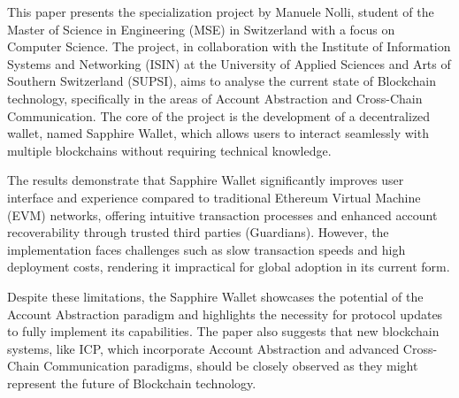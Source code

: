 \label{chap:abstract}

This paper presents the specialization project by Manuele Nolli, student of the Master of Science in Engineering (MSE) in Switzerland with a focus on Computer Science. The project, in collaboration with the Institute of Information Systems and Networking (ISIN) at the University of Applied Sciences and Arts of Southern Switzerland (SUPSI), aims to analyse the current state of Blockchain technology, specifically in the areas of Account Abstraction and Cross-Chain Communication. The core of the project is the development of a decentralized wallet, named Sapphire Wallet, which allows users to interact seamlessly with multiple blockchains without requiring technical knowledge.

The results demonstrate that Sapphire Wallet significantly improves user interface and experience compared to traditional Ethereum Virtual Machine (EVM) networks, offering intuitive transaction processes and enhanced account recoverability through trusted third parties (Guardians). However, the implementation faces challenges such as slow transaction speeds and high deployment costs, rendering it impractical for global adoption in its current form.

Despite these limitations, the Sapphire Wallet showcases the potential of the Account Abstraction paradigm and highlights the necessity for protocol updates to fully implement its capabilities. The paper also suggests that new blockchain systems, like ICP, which incorporate Account Abstraction and advanced Cross-Chain Communication paradigms, should be closely observed as they might represent the future of Blockchain technology.


